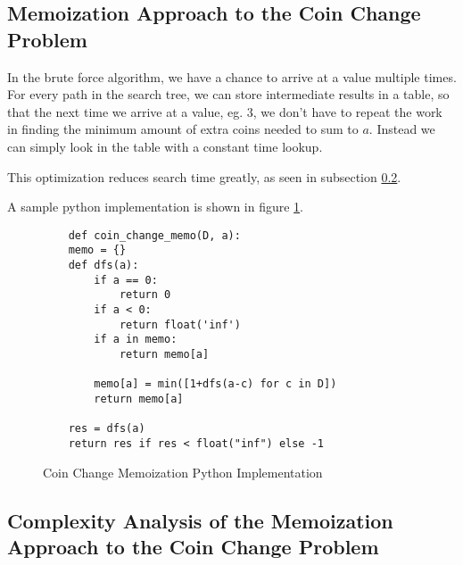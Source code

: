 \subsection{Memoization Approach to the Coin Change Problem}

In the brute force algorithm, we have a chance to arrive at a value multiple times. For every path in the search tree, we can store intermediate results in a table, so that the next time we arrive at a value, eg. 3, we don't have to repeat the work in finding the minimum amount of extra coins needed to sum to $a$. Instead we can simply look in the table with a constant time lookup.

This optimization reduces search time greatly, as seen in subsection \ref{subsec:ca-coin-change-memo}.

A sample python implementation is shown in figure \ref{fig:coin-change-memo}.

\begin{figure}[H]
    \centering
    \begin{lstlisting}
    def coin_change_memo(D, a):
    memo = {}
    def dfs(a):
        if a == 0:
            return 0
        if a < 0:
            return float('inf')
        if a in memo:
            return memo[a]
        
        memo[a] = min([1+dfs(a-c) for c in D])
        return memo[a]
            
    res = dfs(a)
    return res if res < float("inf") else -1
    \end{lstlisting}
    \caption{Coin Change Memoization Python Implementation}
    \label{fig:coin-change-memo}
\end{figure}

\subsection{Complexity Analysis of the Memoization Approach to the Coin Change Problem}\label{subsec:ca-coin-change-memo}

